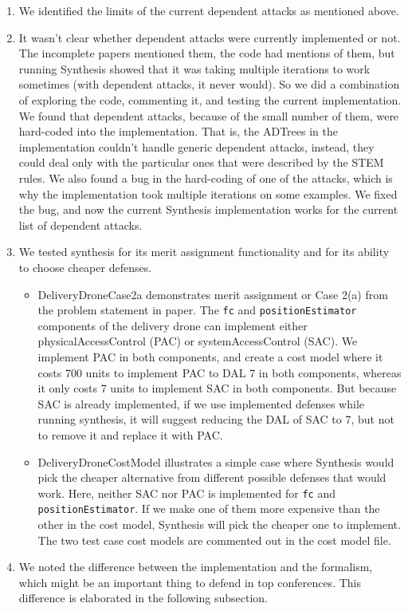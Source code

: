 \documentclass{article}
\begin{document}
	\begin{enumerate}
		\item We identified the limits of the 
		current dependent attacks as mentioned 
		above.
		\item It wasn't clear whether dependent 
		attacks were currently implemented or not.
		The incomplete papers mentioned them, the 
		code had mentions of them, but running 
		Synthesis showed that it was taking
		multiple iterations to work sometimes
		(with dependent attacks, it never would).
		So we did a combination of exploring the
		code, commenting it, and testing the current 
		implementation. We found that dependent 
		attacks, because of the small number of 
		them, were hard-coded into the implementation.
		That is, the ADTrees in the implementation
		couldn't handle generic dependent attacks,
		instead, they could deal only with the 
		particular ones that were described by 
		the STEM rules. We also found a bug 
		in the hard-coding of one of the attacks, 
		which is why the implementation took 
		multiple iterations on some examples.
		We fixed the bug, and now the current
		Synthesis implementation works for the 
		current list of dependent attacks.
		\item We tested synthesis for its merit 
		assignment functionality and for its 
		ability to choose cheaper defenses. 
		\begin{itemize}
			\item DeliveryDroneCase2a demonstrates 
			merit assignment or Case 2(a) from
			the problem statement in paper. The 
			\texttt{fc} and \texttt{positionEstimator}
			components of the delivery drone can 
			implement either physicalAccessControl (PAC)
			or systemAccessControl (SAC). We implement 
			PAC in both components, and create a cost 
			model where it costs 700 units to implement 
			PAC to DAL 7 in both components, 
			whereas it only costs 7 units to implement
			SAC in both components. But because SAC is 
			already implemented, if we use implemented
			defenses while running synthesis, it will 
			suggest reducing the DAL of SAC to 7, 
			but not to remove it and replace it with PAC. 
			\item DeliveryDroneCostModel illustrates
			a simple case where Synthesis would pick 
			the cheaper alternative from different
			possible defenses that would work. Here,
			neither SAC nor PAC is implemented for 
			\texttt{fc} and \texttt{positionEstimator}.
			If we make one of them more expensive than
			the other in the cost model, Synthesis will
			pick the cheaper one to implement. The 
			two test case cost models are commented 
			out in the cost model file.
		\end{itemize}
		\item We noted the difference between 
		the implementation and the formalism, 
		which might be an important thing to 
		defend in top conferences. This difference
		is elaborated in the following subsection.
	\end{enumerate}
\end{document}
